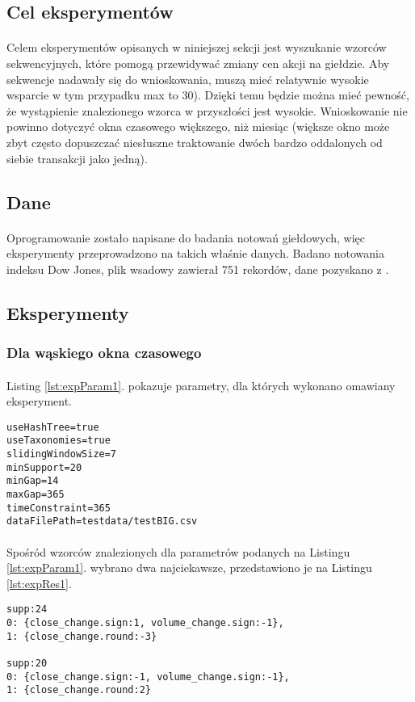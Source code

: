 \documentclass[11pt,a4paper]{article}
\begin{document}
\subsection{Cel eksperymentów}
\paragraph{}Celem eksperymentów opisanych w niniejszej sekcji jest wyszukanie wzorców sekwencyjnych, które pomogą przewidywać zmiany cen akcji na giełdzie. Aby sekwencje nadawały się do wnioskowania, muszą mieć relatywnie wysokie wsparcie w tym przypadku max to 30). Dzięki temu będzie można mieć pewność, że wystąpienie znalezionego wzorca w przyszłości jest wysokie. Wnioskowanie nie powinno dotyczyć okna czasowego większego, niż miesiąc (większe okno może zbyt często dopuszczać niesłuszne traktowanie dwóch bardzo oddalonych od siebie transakcji jako jedną).
\subsection{Dane}
\paragraph{}Oprogramowanie zostało napisane do badania notowań giełdowych, więc eksperymenty przeprowadzono na takich właśnie danych. Badano notowania indeksu Dow Jones, plik wsadowy zawierał 751 rekordów, dane pozyskano z \cite{bib:DowJones}.
\subsection{Eksperymenty}
\subsubsection{Dla wąskiego okna czasowego}
\paragraph{}Listing \ref{lst:expParam1}. pokazuje parametry, dla których wykonano omawiany eksperyment.
\begin{lstlisting}[caption={Parametry, eksperyment 1},label={lst:expParam1}]
useHashTree=true
useTaxonomies=true
slidingWindowSize=7
minSupport=20
minGap=14
maxGap=365
timeConstraint=365
dataFilePath=testdata/testBIG.csv
\end{lstlisting}
\paragraph{} Spośród wzorców znalezionych dla parametrów podanych na Listingu \ref{lst:expParam1}. wybrano dwa najciekawsze, przedstawiono je na Listingu \ref{lst:expRes1}.
\begin{lstlisting}[caption={Wzorce, eksperyment 1},label={lst:expRes1}]
supp:24
0: {close_change.sign:1, volume_change.sign:-1},
1: {close_change.round:-3}

supp:20
0: {close_change.sign:-1, volume_change.sign:-1},
1: {close_change.round:2}
\end{lstlisting}
\end{document}
